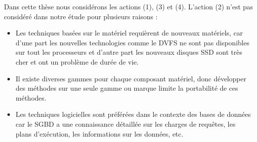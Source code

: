 Dans cette thèse nous considérons les actions (1), (3) et (4). L'action (2) n'est pas considéré dans notre étude pour plusieurs raisons :
\begin{itemize}
	\item Les techniques basées sur le matériel requièrent de nouveaux matériels, car d'une part les nouvelles technologies comme le DVFS ne sont pas disponibles sur tout les processeurs et d'autre part les nouveaux disques SSD sont très cher et ont un problème de durée de vie. 
	\item Il existe diverses gammes pour chaque composant matériel, donc développer des méthodes sur une seule gamme ou marque limite la portabilité de ces méthodes.
	\item Les techniques logicielles sont préférées dans le contexte des bases de données car le SGBD a une connaissance détaillée sur les charges de requêtes, les plans d'exécution, les informations sur les données, etc.
\end{itemize}

